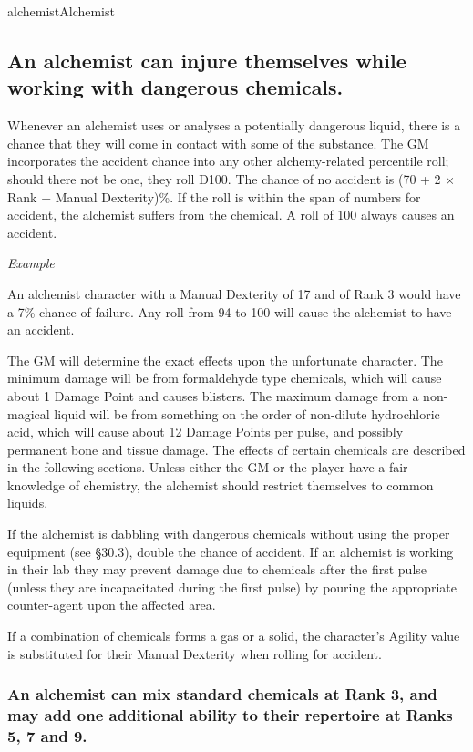 \begin{Skill}[1.1]{alchemist}{Alchemist}
\subsection{An alchemist can injure themselves while working with dangerous chemicals.}

Whenever an alchemist uses or analyses a potentially dangerous liquid,
there is a chance that they will come in contact with some of the
substance.  The GM incorporates the accident chance into any other
alchemy-related percentile roll; should there not be one, they roll
D100.  The chance of no accident is (70 + 2 × Rank + Manual
Dexterity)\%.  If the roll is within the span of numbers for accident,
the alchemist suffers from the chemical.  A roll of 100 always causes
an accident.

\emph{Example}

An alchemist character with a Manual Dexterity of 17 and of
Rank 3 would have a 7\% chance of failure. Any roll from 94 to 100
will cause the alchemist to have an accident.

The GM will determine the exact effects upon the unfortunate
character.  The minimum damage will be from formaldehyde type
chemicals, which will cause about 1 Damage Point and causes blisters.
The maximum damage from a non-magical liquid will be from something on
the order of non-dilute hydrochloric acid, which will cause about 12
Damage Points per pulse, and possibly permanent bone and tissue
damage.  The effects of certain chemicals are described in the
following sections. Unless either the GM or the player have a fair
knowledge of chemistry, the alchemist should restrict themselves to
common liquids.

If the alchemist is dabbling with dangerous chemicals without using
the proper equipment (see §30.3), double the chance of accident. If an
alchemist is working in their lab they may prevent damage due to
chemicals after the first pulse (unless they are incapacitated during
the first pulse) by pouring the appropriate counter-agent upon the
affected area.

If a combination of chemicals forms a gas or a solid, the character’s
Agility value is substituted for their Manual Dexterity when rolling
for accident.

\subsubsection{An alchemist can mix standard chemicals at Rank 3, and may add one
additional ability to their repertoire at Ranks 5, 7 and 9.}


\end{Skill}
